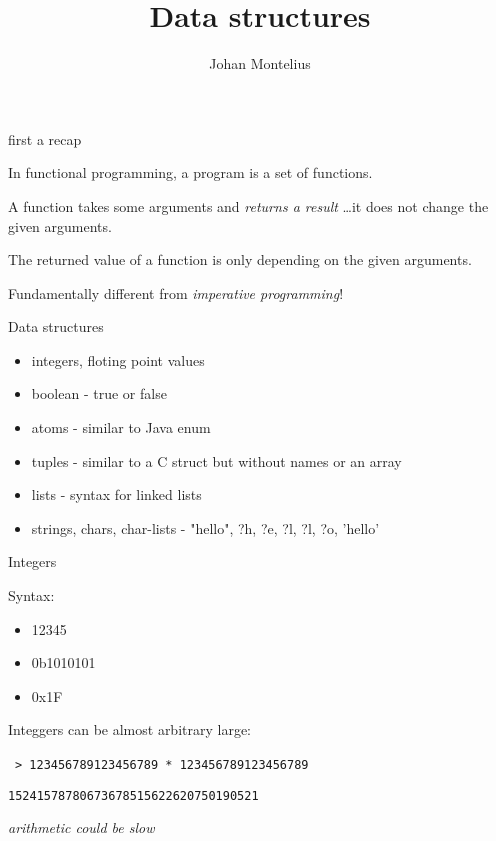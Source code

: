 

\title[ID1019 Data structures]{Data structures}


\author{Johan Montelius}
\date{\semester}



\begin{frame}
\titlepage
\end{frame}

\begin{frame}{first a recap}

\pause In functional programming, a program is a set of functions.

\vspace{20pt}\pause A function takes some arguments and {\em returns a result} \ldots it does not change the given arguments.

\vspace{20pt}\pause The returned value of a function is only depending on the given arguments.

\vspace{20pt}\pause Fundamentally different from {\em imperative programming}!


\end{frame}


\begin{frame}{Data structures}

  \begin{itemize}
  \item integers, floting point values \pause
  \item boolean - true or false
  \item atoms - similar to Java enum \pause
  \item tuples - similar to a C struct but without names or an array\pause
  \item lists - syntax for linked lists
  \item strings, chars, char-lists - "hello", ?h, ?e, ?l, ?l, ?o, 'hello'
  \end{itemize}

\end{frame}

\begin{frame}{Integers}

  Syntax:
  \space{10pt}
  \begin{itemize}
  \item 12345 \pause
  \item 0b1010101 \pause
  \item 0x1F \pause
  \end{itemize}  
  
  Integgers can be almost arbitrary large: \pause

  \vspace{10pt}\
  {\tt > 123456789123456789 * 123456789123456789}\pause

  {\tt 15241578780673678515622620750190521} \pause
  
  \vspace{20pt}\pause
  {\em arithmetic could be slow}
\end{frame}

